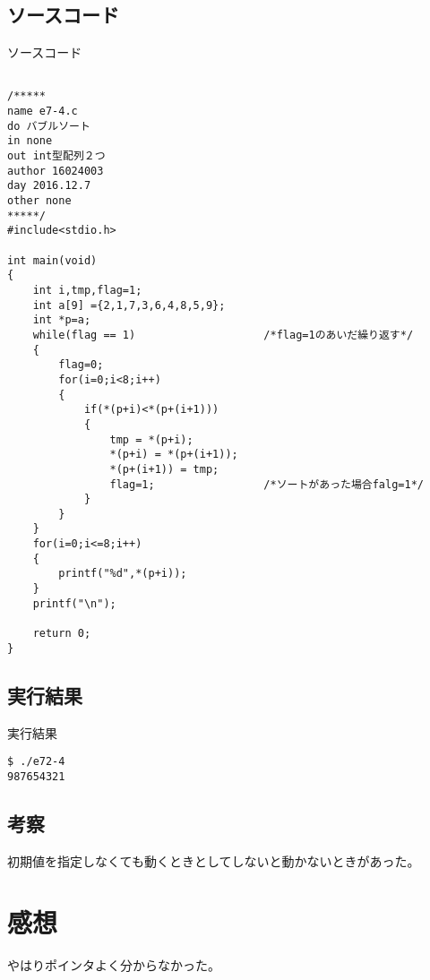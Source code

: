 \documentclass[a4j,titlepage]{jarticle}
\begin{document}
\subsection{ソースコード}
\begin{breakitembox}[l]{ソースコード}
\begin{verbatim}

/*****
name e7-4.c
do バブルソート
in none
out int型配列２つ
author 16024003
day 2016.12.7
other none
*****/
#include<stdio.h>

int main(void)
{
    int i,tmp,flag=1;
    int a[9] ={2,1,7,3,6,4,8,5,9};
    int *p=a;
    while(flag == 1)                    /*flag=1のあいだ繰り返す*/
    {
        flag=0;
        for(i=0;i<8;i++)
        {
            if(*(p+i)<*(p+(i+1)))
            {
                tmp = *(p+i);
                *(p+i) = *(p+(i+1));
                *(p+(i+1)) = tmp;
                flag=1;                 /*ソートがあった場合falg=1*/
            }
        }
    }
    for(i=0;i<=8;i++)
    {
        printf("%d",*(p+i));
    }
    printf("\n");

    return 0;
}
\end{verbatim}
\end{breakitembox}

\subsection{実行結果}
\begin{itembox}[l]{実行結果}
\begin{verbatim}
$ ./e72-4
987654321
\end{verbatim}
\end{itembox}

\subsection{考察}
初期値を指定しなくても動くときとしてしないと動かないときがあった。

\section{感想}
やはりポインタよく分からなかった。
\end{document}
